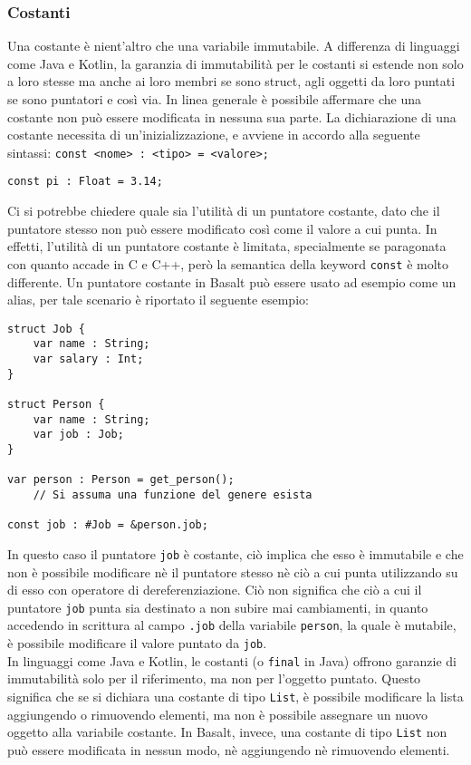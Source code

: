 \subsubsection{Costanti}
Una costante è nient'altro che una variabile immutabile. A differenza di linguaggi come Java e Kotlin, la garanzia di immutabilità per le costanti
si estende non solo a loro stesse ma anche ai loro membri se sono struct, agli oggetti da loro puntati se sono puntatori e così via. In linea generale
è possibile affermare che una costante non può essere modificata in nessuna sua parte. La dichiarazione di una costante necessita di un'inizializzazione, 
e avviene in accordo alla seguente sintassi: \texttt{const <nome> : <tipo> = <valore>;}

\vspace{0.5cm}
\begin{lstlisting}[frame=single]
const pi : Float = 3.14;
\end{lstlisting}
\vspace{0.5cm}

Ci si potrebbe chiedere quale sia l'utilità di un puntatore costante, dato che il puntatore stesso non può essere modificato così come il valore a cui punta.
In effetti, l'utilità di un puntatore costante è limitata, specialmente se paragonata con quanto accade in C e C++, però la semantica della keyword \texttt{const}
è molto differente. Un puntatore costante in Basalt può essere usato ad esempio come un alias, per tale scenario è riportato il seguente esempio:

\vspace{0.5cm}
\begin{lstlisting}[frame=single]
struct Job {
    var name : String;
    var salary : Int;
}

struct Person {
    var name : String;
    var job : Job;
}

var person : Person = get_person(); 
    // Si assuma una funzione del genere esista

const job : #Job = &person.job;
\end{lstlisting}
\vspace{0.5cm}

In questo caso il puntatore \texttt{job} è costante, ciò implica che esso è immutabile e che non è possibile modificare nè 
il puntatore stesso nè ciò a cui punta utilizzando su di esso con operatore di dereferenziazione. Ciò non significa che ciò a cui il 
puntatore \texttt{job} punta sia destinato a non subire mai cambiamenti, in quanto accedendo in scrittura al campo \texttt{.job} della 
variabile \texttt{person}, la quale è mutabile, è possibile modificare il valore puntato da \texttt{job}. \\

In linguaggi come Java e Kotlin, le costanti (o \texttt{final} in Java) offrono garanzie di immutabilità solo per il riferimento, 
ma non per l'oggetto puntato. Questo significa che se si dichiara una costante di tipo \texttt{List}, è possibile modificare la lista
aggiungendo o rimuovendo elementi, ma non è possibile assegnare un nuovo oggetto alla variabile costante. In Basalt, invece, una costante
di tipo \texttt{List} non può essere modificata in nessun modo, nè aggiungendo nè rimuovendo elementi. \\